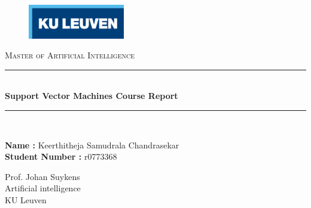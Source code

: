 \documentclass[12pt]{report}
\newcommand{\HRule}{\rule{\linewidth}{0.5mm}}
\begin{document}
\vspace{5 cm}
	\begin{figure}
		\vspace*{1cm}
		\begin{flushright}
			\includegraphics[height=15mm]{KU Leuven logo}
		\end{flushright}
	\end{figure}
	
	\begin{center}
		\vspace*{0.7cm}
		\textsc{\LARGE Master of Artificial Intelligence}\\[1.0cm]
		\vspace*{1cm}
		\HRule \\[0.4cm]
		{ \huge \bfseries Support Vector Machines Course Report}\\[0.15cm] 
		\HRule \\[1.5cm]
	\end{center}
	
	\begin{minipage}{0.5\textwidth}
		\vspace*{3cm}
		\begin{flushleft} \large
			{\bf Name :} Keerthitheja Samudrala Chandrasekar\\
			{\bf Student Number :} r0773368
		\end{flushleft}
	\end{minipage}
	\begin{minipage}{0.4\textwidth}
		\vspace*{3cm}
		\begin{flushright} \large
			Prof. Johan Suykens \\
			Artificial intelligence\\
			KU Leuven
			
		\end{flushright}
	\end{minipage}\\[2cm]
	\newpage
	\tableofcontents
	\newpage

	
	
	
\end{document}
